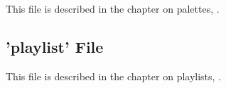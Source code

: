    This file is described in the chapter on palettes, .

\subsection{'playlist' File}
\label{subsec:configuration_playlist}

   This file is described in the chapter on playlists, .

